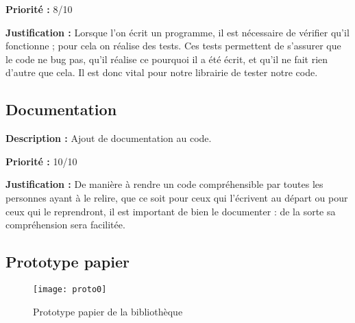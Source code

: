 \begin{titlepage}
{\textbf{Priorité :} 8/10

\textbf{Justification :} Lorsque l'on écrit un programme, il est nécessaire de vérifier qu'il fonctionne ; pour cela on réalise des tests. Ces tests permettent de s'assurer que le code ne bug pas, qu'il réalise ce pourquoi il a été écrit, et qu'il ne fait rien d'autre que cela. Il est donc vital pour notre librairie de tester notre code.
}

\subsection{Documentation}

{
\textbf{Description :} Ajout de documentation au code.

\textbf{Priorité :} 10/10

\textbf{Justification :} De manière à rendre un code compréhensible par toutes les personnes ayant à le relire, que ce soit pour ceux qui l'écrivent au départ ou pour ceux qui le reprendront, il est important de bien le documenter : de la sorte sa compréhension sera facilitée.
}

\vspace{1cm}
\subsection{Prototype papier}

\begin{figure}[h]
\centering
\texttt{[image: proto0]}
\caption{Prototype papier de la bibliothèque}
\end{figure}


\end{titlepage}
